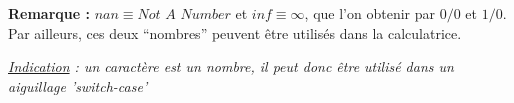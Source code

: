 \documentclass[../../../main.tex]{subfiles}
\begin{document}
\textbf{Remarque : } $nan\equiv{\textit{Not A Number}}$ et $inf\equiv{\infty}$, que l'on obtenir par $0/0$ et $1/0$. Par ailleurs, ces deux ``nombres'' peuvent être utilisés dans la calculatrice.
 
\textit{\underline{Indication} : un caractère est un nombre, il peut donc être utilisé dans un aiguillage 'switch-case'}
\end{document}
